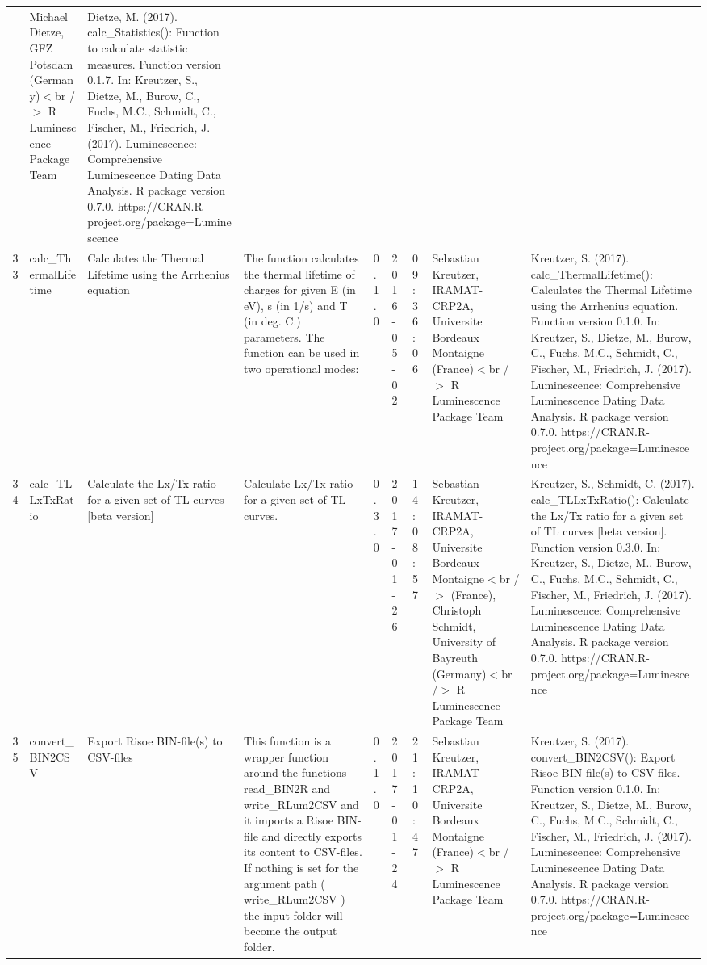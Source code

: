 \begin{table}[ht]
\begin{tabular}{rllllllll}
 & Michael Dietze, GFZ Potsdam (Germany)$<$br /$>$  R Luminescence Package Team & Dietze, M. (2017). calc\_Statistics(): Function to calculate statistic measures. Function version 0.1.7. In: Kreutzer, S., Dietze, M., Burow, C., Fuchs, M.C., Schmidt, C., Fischer, M., Friedrich, J. (2017). Luminescence: Comprehensive Luminescence Dating Data Analysis. R package version 0.7.0. https://CRAN.R-project.org/package=Luminescence
 \\ 
  33 & calc\_ThermalLifetime & Calculates the Thermal Lifetime using the Arrhenius equation & The function calculates the thermal lifetime of charges for given E (in eV), s (in 1/s) and T (in deg. C.) parameters. The function can be used in two operational modes: & 0.1.0 & 2016-05-02 & 09:36:06
 & Sebastian Kreutzer, IRAMAT-CRP2A, Universite Bordeaux Montaigne (France)$<$br /$>$  R Luminescence Package Team & Kreutzer, S. (2017). calc\_ThermalLifetime(): Calculates the Thermal Lifetime using the Arrhenius equation. Function version 0.1.0. In: Kreutzer, S., Dietze, M., Burow, C., Fuchs, M.C., Schmidt, C., Fischer, M., Friedrich, J. (2017). Luminescence: Comprehensive Luminescence Dating Data Analysis. R package version 0.7.0. https://CRAN.R-project.org/package=Luminescence
 \\ 
  34 & calc\_TLLxTxRatio & Calculate the Lx/Tx ratio for a given set of TL curves [beta version] & Calculate Lx/Tx ratio for a given set of TL curves. & 0.3.0 & 2017-01-26 & 14:08:57
 & Sebastian Kreutzer, IRAMAT-CRP2A, Universite Bordeaux Montaigne$<$br /$>$ (France), Christoph Schmidt, University of Bayreuth (Germany)$<$br /$>$  R Luminescence Package Team & Kreutzer, S., Schmidt, C. (2017). calc\_TLLxTxRatio(): Calculate the Lx/Tx ratio for a given set of TL curves [beta version]. Function version 0.3.0. In: Kreutzer, S., Dietze, M., Burow, C., Fuchs, M.C., Schmidt, C., Fischer, M., Friedrich, J. (2017). Luminescence: Comprehensive Luminescence Dating Data Analysis. R package version 0.7.0. https://CRAN.R-project.org/package=Luminescence
 \\ 
  35 & convert\_BIN2CSV & Export Risoe BIN-file(s) to CSV-files & This function is a wrapper function around the functions  read\_BIN2R  and write\_RLum2CSV  and it imports a Risoe BIN-file and directly exports its content to CSV-files. If nothing is set for the argument  path  ( write\_RLum2CSV ) the input folder will become the output folder. & 0.1.0 & 2017-01-24 & 21:10:47
 & Sebastian Kreutzer, IRAMAT-CRP2A, Universite Bordeaux Montaigne (France)$<$br /$>$  R Luminescence Package Team & Kreutzer, S. (2017). convert\_BIN2CSV(): Export Risoe BIN-file(s) to CSV-files. Function version 0.1.0. In: Kreutzer, S., Dietze, M., Burow, C., Fuchs, M.C., Schmidt, C., Fischer, M., Friedrich, J. (2017). Luminescence: Comprehensive Luminescence Dating Data Analysis. R package version 0.7.0. https://CRAN.R-project.org/package=Luminescence

\end{tabular}
\end{table}
